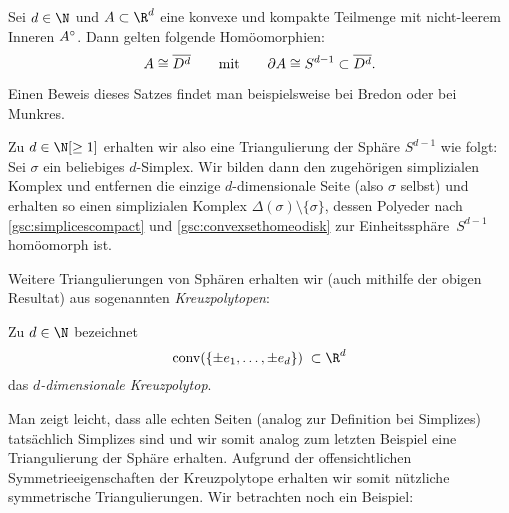 \begin{thSatz}
    \label{gsc:convexsethomeodisk}
    Sei $d\in\N$ und $A\subset\R^d$ eine konvexe und kompakte Teilmenge mit
    nicht-leerem Inneren $A^\circ$. Dann gelten folgende Homöomorphien:
    \[ A\cong\overline{D^d} \qquad\text{mit}\qquad 
        \partial A \cong S^{d-1} \subset \overline{D^d} . \]
\end{thSatz}

Einen Beweis dieses Satzes findet man beispielsweise bei
Bredon\cite[Ch.\,I,.]{bookc:bredon93} oder bei
Munkres\cite[Ch.\,1,\;\S1,]{bookc:munkres84}.

\begin{thBeispiel}
    Zu $d\in\N[\geq1]$ erhalten wir also eine Triangulierung der Sphäre
    $S^{d-1}$ wie folgt: Sei $\sigma$ ein beliebiges $d$-Simplex. Wir bilden
    dann den zugehörigen simplizialen Komplex und entfernen die einzige
    $d$-dimensionale Seite (also $\sigma$ selbst) und erhalten so einen
    simplizialen Komplex $\Delta(\sigma)\setminus\{\sigma\}$, dessen Polyeder
    nach \cref{gsc:simplicescompact} und \cref{gsc:convexsethomeodisk} zur
    Einheitssphäre~$S^{d-1}$ homöomorph ist.
\end{thBeispiel}


Weitere Triangulierungen von Sphären erhalten wir (auch mithilfe der obigen
Resultat) aus sogenannten \emph{Kreuzpolytopen}:

\begin{thDef}[Kreuzpolytop]
    Zu $d\in\N$ bezeichnet
    \[ \conv(\{ \pm e_1, \ldots, \pm e_d \}) \;\subset\R^d \]
    das \emph{$d$-dimensionale Kreuzpolytop}.
\end{thDef}


Man zeigt leicht, dass alle echten Seiten (analog zur Definition bei Simplizes)
tatsächlich Simplizes sind und wir somit analog zum letzten Beispiel eine
Triangulierung der Sphäre erhalten. Aufgrund der offensichtlichen
Symmetrieeigenschaften der Kreuzpolytope erhalten wir somit nützliche symmetrische
Triangulierungen. Wir betrachten noch ein Beispiel:

